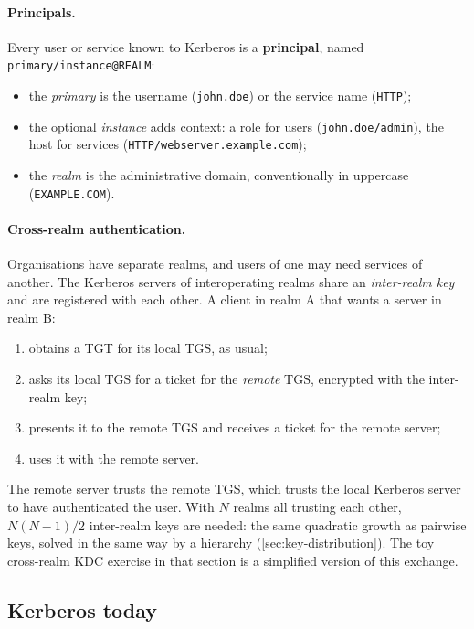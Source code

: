 \paragraph{Principals.} Every user or service known to Kerberos is a \textbf{principal}, named \texttt{primary/\allowbreak instance@\allowbreak REALM}:
\begin{itemize}
    \item the \emph{primary} is the username (\texttt{john.doe}) or the service name (\texttt{HTTP});
    \item the optional \emph{instance} adds context: a role for users (\texttt{john.doe/admin}), the host for services (\texttt{HTTP/webserver.example.com});
    \item the \emph{realm} is the administrative domain, conventionally in uppercase (\texttt{EXAMPLE.COM}).
\end{itemize}

\paragraph{Cross-realm authentication.} Organisations have separate realms, and users of one may need services of another. The Kerberos servers of interoperating realms share an \emph{inter-realm key} and are registered with each other. A client in realm A that wants a server in realm B:
\begin{enumerate}
    \item[1--2.] obtains a TGT for its local TGS, as usual;
    \item[3--4.] asks its local TGS for a ticket for the \emph{remote} TGS, encrypted with the inter-realm key;
    \item[5--6.] presents it to the remote TGS and receives a ticket for the remote server;
    \item[7.] uses it with the remote server.
\end{enumerate}
The remote server trusts the remote TGS, which trusts the local Kerberos server to have authenticated the user. With $N$ realms all trusting each other, $N(N-1)/2$ inter-realm keys are needed: the same quadratic growth as pairwise keys, solved in the same way by a hierarchy (\cref{sec:key-distribution}). The toy cross-realm KDC exercise in that section is a simplified version of this exchange.

\subsection{Kerberos today}

